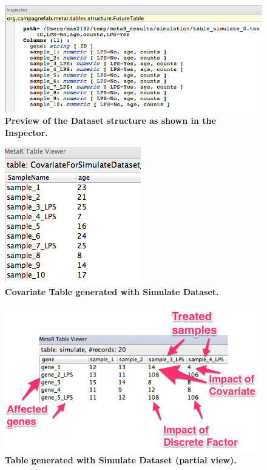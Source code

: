 \begin{figure}[h!tbp]
  \centering
  \includegraphics[width=\figWidthWide]{figures/SimulateTableInspector.png}
\caption[SimulateDataset Inspector.]{\textbf{Preview of the Dataset structure as shown in the Inspector.}}
\label{fig:SimulateDatasetInspector}
\end{figure}


\begin{figure}[h!tbp]
  \centering
  \includegraphics[width=\figWidthNarrow]{figures/SimulateCovariateTableInspector.png}
\caption[SimulateCovariateTableInspector.]{\textbf{Covariate Table generated with Simulate Dataset.}}
\label{fig:SimulateCovariateTableInspector}
\end{figure}


\begin{figure}[h!tbp]
  \centering
  \includegraphics[width=\figWidthWide]{figures/SimulateTableViewer.png}
\caption[Table generated with Simulate Dataset.]{\textbf{Table generated with Simulate Dataset (partial view).}}
\label{fig:SimulateDatasetViewer}
\end{figure}

